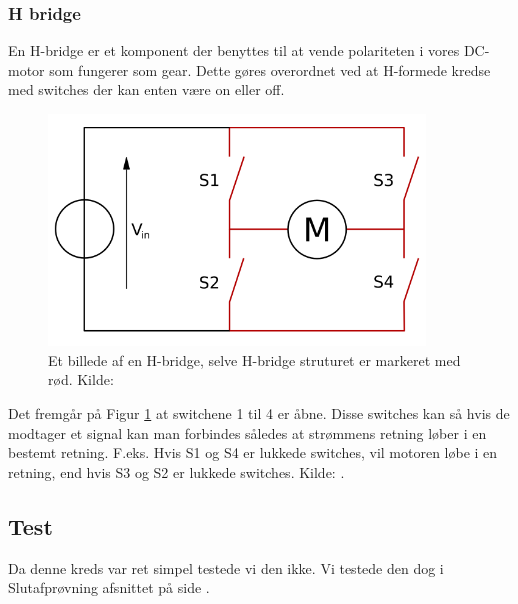 \subsubsection{H bridge}\label{subs:hbridgeTeori}
En H-bridge er et komponent der benyttes til at vende polariteten i vores DC-motor som fungerer som gear. Dette gøres overordnet ved at H-formede kredse med switches der kan enten være on eller off. 
\begin{figure}[H]
	\centering
    \includegraphics[width=10cm]{figures/2_4_3hastighed/hbridge.png}
	\caption{Et billede af en H-bridge, selve H-bridge struturet er markeret med rød. Kilde: \cite{teorihbridge}}
	\label{fig:hbridge}
\end{figure}
Det fremgår på Figur \ref{fig:hbridge} at switchene 1 til 4 er åbne. Disse switches kan så hvis de modtager et signal kan man forbindes således at strømmens retning løber i en bestemt retning. F.eks. Hvis S1 og S4 er lukkede switches, vil motoren løbe i en retning, end hvis S3 og S2 er lukkede switches. Kilde: \cite{teorihbridge}. 


\subsection{Test}

Da denne kreds var ret simpel testede vi den ikke. Vi testede den dog i Slutafprøvning afsnittet på side \pageref{sluttest}.